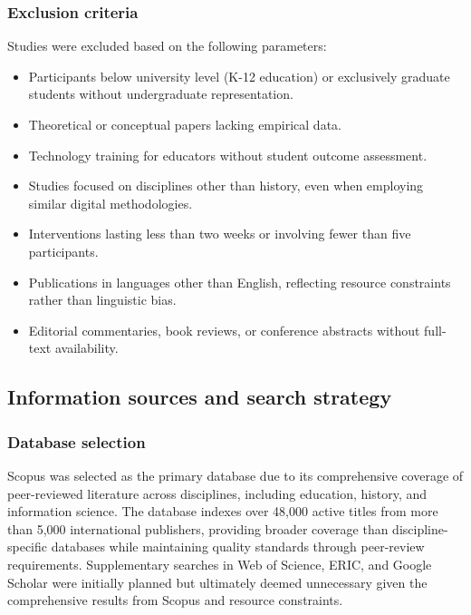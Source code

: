 \documentclass[
hf,
]{ceurart}
\begin{document}
\subsubsection{Exclusion criteria}

Studies were excluded based on the following parameters:

\begin{itemize}[leftmargin=*,itemsep=3pt]
\item Participants below university level (K-12 education) or exclusively graduate students without undergraduate representation.
\item Theoretical or conceptual papers lacking empirical data.
\item Technology training for educators without student outcome assessment.
\item Studies focused on disciplines other than history, even when employing similar digital methodologies.
\item Interventions lasting less than two weeks or involving fewer than five participants.
\item Publications in languages other than English, reflecting resource constraints rather than linguistic bias.
\item Editorial commentaries, book reviews, or conference abstracts without full-text availability.
\end{itemize}

\subsection{Information sources and search strategy}

\subsubsection{Database selection}

Scopus was selected as the primary database due to its comprehensive coverage of peer-reviewed literature across disciplines, including education, history, and information science. The database indexes over 48,000 active titles from more than 5,000 international publishers, providing broader coverage than discipline-specific databases while maintaining quality standards through peer-review requirements. Supplementary searches in Web of Science, ERIC, and Google Scholar were initially planned but ultimately deemed unnecessary given the comprehensive results from Scopus and resource constraints.
\end{document}
